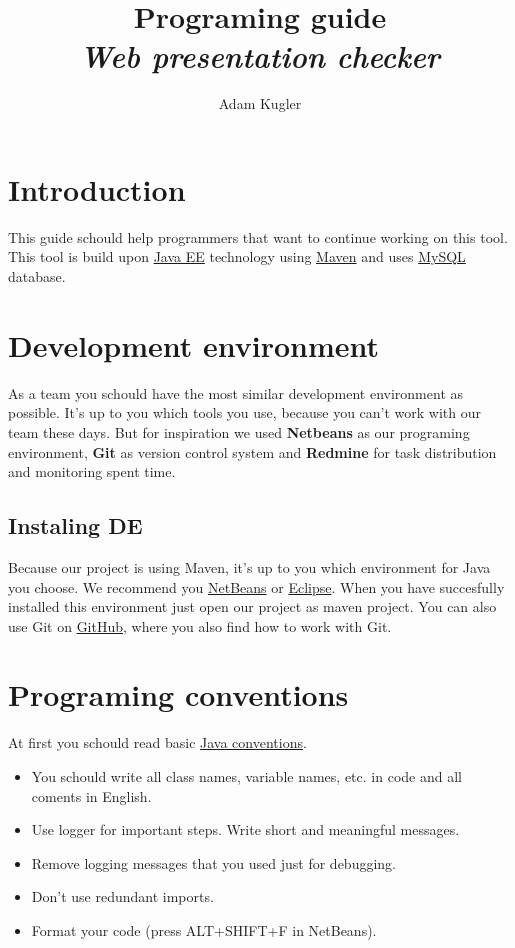 \documentclass[12pt,a4paper]{article}
\author{Adam Kugler}
\title{Programing guide\\\textit{Web presentation checker}}
\begin{document}
\maketitle
\tableofcontents
\newpage

\section {Introduction}
This guide schould help programmers that want to continue working on this tool. This tool is build upon
\href{http://www.oracle.com/technetwork/java/javaee/overview/index.html}{Java EE} technology using \href{http://maven.apache.org/}{Maven} and uses \href{http://www.mysql.com/}{MySQL} database.

\section {Development environment}
As a team you schould have the most similar development environment as possible. It's up to you which tools you use, because you can't work with our team these days. But for inspiration we used \textbf{Netbeans} as our programing environment, \textbf{Git} as version control system and \textbf{Redmine} for task distribution and monitoring spent time.
\subsection {Instaling DE}
Because our project is using Maven, it's up to you which environment for Java you choose. We recommend you \href{https://netbeans.org/}{NetBeans} or \href{https://eclipse.org/}{Eclipse}. When you have succesfully installed this environment just open our project as maven project. You can also use Git on \href{https://github.com/}{GitHub}, where you also find how to work with Git.

\section{Programing conventions}
At first you schould read basic \href{http://www.oracle.com/technetwork/java/codeconvtoc-136057.html}{Java conventions}.
\begin{itemize}
\item You schould write all class names, variable names, etc. in code and all coments in English.
\item Use logger for important steps. Write short and meaningful messages.
\item Remove logging messages that you used just for debugging.
\item Don't use redundant imports.
\item Format your code (press ALT+SHIFT+F in NetBeans).
\end{itemize}
\end{document}
